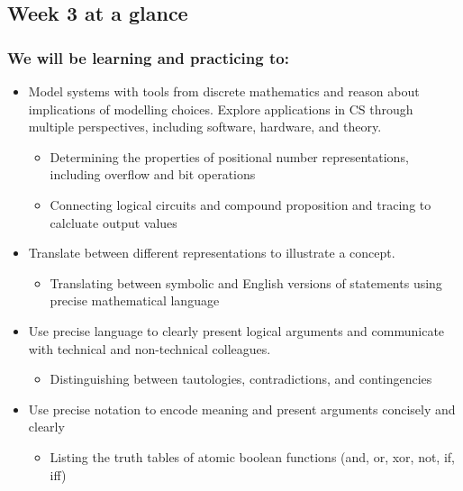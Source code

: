 

\subsection*{Week 3 at a glance}

\subsubsection*{We will be learning and practicing to:}
\begin{itemize}
\item Model systems with tools from discrete mathematics and reason about implications of modelling choices. Explore applications in CS through multiple perspectives, including software, hardware, and theory.
\begin{itemize}
    \item Determining the properties of positional number representations, including overflow and bit operations
   \item Connecting logical circuits and compound proposition and tracing to calcluate output values
\end{itemize}

\item Translate between different representations to illustrate a concept.
\begin{itemize}
   \item Translating between symbolic and English versions of statements using precise mathematical language
\end{itemize}

\item Use precise language to clearly present logical arguments and communicate with technical and non-technical colleagues.
\begin{itemize}
    \item Distinguishing between tautologies, contradictions, and contingencies
\end{itemize}

\item Use precise notation to encode meaning and present arguments concisely and clearly
\begin{itemize}
    \item Listing the truth tables of atomic boolean functions (and, or, xor, not, if, iff)
\end{itemize}


\end{itemize}
